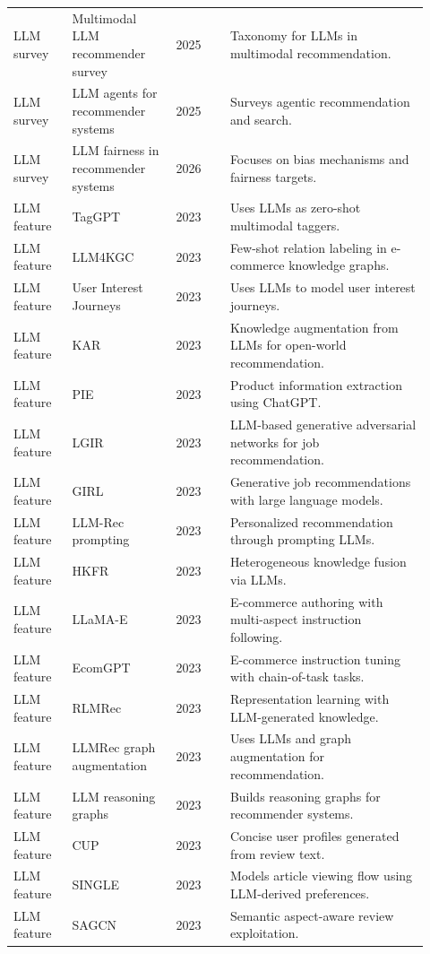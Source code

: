 \documentclass[11pt]{article}
\begin{document}
\begin{longtable}{@{}p{0.13\linewidth}p{0.23\linewidth}p{0.12\linewidth}p{0.44\linewidth}@{}}
LLM survey & Multimodal LLM recommender survey & 2025 & Taxonomy for LLMs in multimodal recommendation.\\
LLM survey & LLM agents for recommender systems & 2025 & Surveys agentic recommendation and search.\\
LLM survey & LLM fairness in recommender systems & 2026 & Focuses on bias mechanisms and fairness targets.\\
LLM feature & TagGPT & 2023 & Uses LLMs as zero-shot multimodal taggers.\\
LLM feature & LLM4KGC & 2023 & Few-shot relation labeling in e-commerce knowledge graphs.\\
LLM feature & User Interest Journeys & 2023 & Uses LLMs to model user interest journeys.\\
LLM feature & KAR & 2023 & Knowledge augmentation from LLMs for open-world recommendation.\\
LLM feature & PIE & 2023 & Product information extraction using ChatGPT.\\
LLM feature & LGIR & 2023 & LLM-based generative adversarial networks for job recommendation.\\
LLM feature & GIRL & 2023 & Generative job recommendations with large language models.\\
LLM feature & LLM-Rec prompting & 2023 & Personalized recommendation through prompting LLMs.\\
LLM feature & HKFR & 2023 & Heterogeneous knowledge fusion via LLMs.\\
LLM feature & LLaMA-E & 2023 & E-commerce authoring with multi-aspect instruction following.\\
LLM feature & EcomGPT & 2023 & E-commerce instruction tuning with chain-of-task tasks.\\
LLM feature & RLMRec & 2023 & Representation learning with LLM-generated knowledge.\\
LLM feature & LLMRec graph augmentation & 2023 & Uses LLMs and graph augmentation for recommendation.\\
LLM feature & LLM reasoning graphs & 2023 & Builds reasoning graphs for recommender systems.\\
LLM feature & CUP & 2023 & Concise user profiles generated from review text.\\
LLM feature & SINGLE & 2023 & Models article viewing flow using LLM-derived preferences.\\
LLM feature & SAGCN & 2023 & Semantic aspect-aware review exploitation.\\

\end{longtable}
\end{document}

